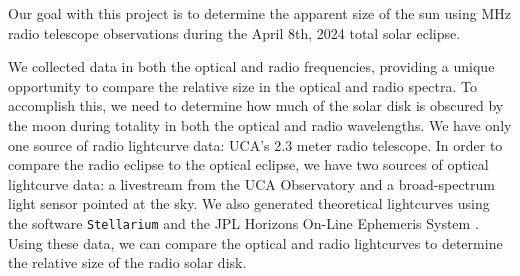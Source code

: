 Our goal with this project is to determine the apparent size of the sun using \unit[1420]{MHz} radio telescope observations during the April 8th, 2024 total solar eclipse.

We collected data in both the optical and radio frequencies, providing a unique opportunity to compare the relative size in the optical and radio spectra.
To accomplish this, we need to determine how much of the solar disk is obscured by the moon during totality in both the optical and radio wavelengths.
We have only one source of radio lightcurve data: UCA's 2.3 meter radio telescope.
In order to compare the radio eclipse to the optical eclipse, we have two sources of optical lightcurve data: a livestream from the UCA Observatory and a broad-spectrum light sensor pointed at the sky.
We also generated theoretical lightcurves using the software \texttt{Stellarium}\cite{zotti_simulated_2020} and the JPL Horizons On-Line Ephemeris System \cite{nasa_jpl_solar_system_dynamics_group_jpl_nodate}.
Using these data, we can compare the optical and radio lightcurves to determine the relative size of the radio solar disk.
